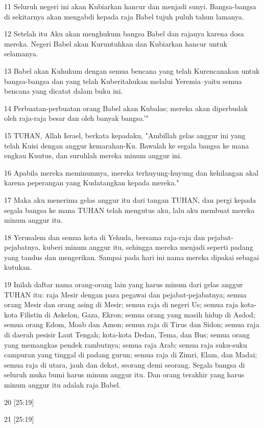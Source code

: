 \par 11 Seluruh negeri ini akan Kubiarkan hancur dan menjadi sunyi. Bangsa-bangsa di sekitarnya akan mengabdi kepada raja Babel tujuh puluh tahun lamanya.
\par 12 Setelah itu Aku akan menghukum bangsa Babel dan rajanya karena dosa mereka. Negeri Babel akan Kuruntuhkan dan Kubiarkan hancur untuk selamanya.
\par 13 Babel akan Kuhukum dengan semua bencana yang telah Kurencanakan untuk bangsa-bangsa dan yang telah Kuberitahukan melalui Yeremia--yaitu semua bencana yang dicatat dalam buku ini.
\par 14 Perbuatan-perbuatan orang Babel akan Kubalas; mereka akan diperbudak oleh raja-raja besar dan oleh banyak bangsa.'"
\par 15 TUHAN, Allah Israel, berkata kepadaku, "Ambillah gelas anggur ini yang telah Kuisi dengan anggur kemarahan-Ku. Bawalah ke segala bangsa ke mana engkau Kuutus, dan suruhlah mereka minum anggur ini.
\par 16 Apabila mereka meminumnya, mereka terhuyung-huyung dan kehilangan akal karena peperangan yang Kudatangkan kepada mereka."
\par 17 Maka aku menerima gelas anggur itu dari tangan TUHAN, dan pergi kepada segala bangsa ke mana TUHAN telah mengutus aku, lalu aku membuat mereka minum anggur itu.
\par 18 Yerusalem dan semua kota di Yehuda, bersama raja-raja dan pejabat-pejabatnya, kuberi minum anggur itu, sehingga mereka menjadi seperti padang yang tandus dan mengerikan. Sampai pada hari ini nama mereka dipakai sebagai kutukan.
\par 19 Inilah daftar nama orang-orang lain yang harus minum dari gelas anggur TUHAN itu: raja Mesir dengan para pegawai dan pejabat-pejabatnya; semua orang Mesir dan orang asing di Mesir; semua raja di negeri Us; semua raja kota-kota Filistin di Askelon, Gaza, Ekron; semua orang yang masih hidup di Asdod; semua orang Edom, Moab dan Amon; semua raja di Tirus dan Sidon; semua raja di daerah pesisir Laut Tengah; kota-kota Dedan, Tema, dan Bus; semua orang yang memangkas pendek rambutnya; semua raja Arab; semua raja suku-suku campuran yang tinggal di padang gurun; semua raja di Zimri, Elam, dan Madai; semua raja di utara, jauh dan dekat, seorang demi seorang. Segala bangsa di seluruh muka bumi harus minum anggur itu. Dan orang terakhir yang harus minum anggur itu adalah raja Babel.
\par 20 [25:19]
\par 21 [25:19]
